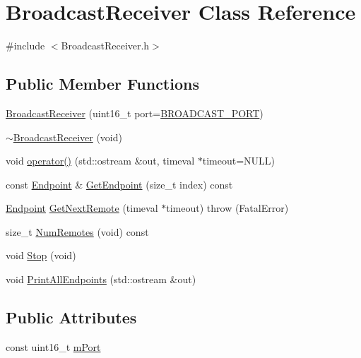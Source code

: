 \hypertarget{class_broadcast_receiver}{\section{Broadcast\-Receiver Class Reference}
\label{class_broadcast_receiver}
}


{\ttfamily \#include $<$Broadcast\-Receiver.\-h$>$}

\subsection*{Public Member Functions}
\begin{DoxyCompactItemize}
\item 
\hyperlink{class_broadcast_receiver_a9c3f8ebdef813f03edec75f88389a6ee}{Broadcast\-Receiver} (uint16\-\_\-t port=\hyperlink{class_broadcast_receiver_a38d37ce60dc1fb1e0dbc08d80b5d3b47}{B\-R\-O\-A\-D\-C\-A\-S\-T\-\_\-\-P\-O\-R\-T})
\item 
\hyperlink{class_broadcast_receiver_a1d262088f10ee4a53d2590bc472864b0}{$\sim$\-Broadcast\-Receiver} (void)
\item 
void \hyperlink{class_broadcast_receiver_ac2fa6c783d73121c800d3c015621964d}{operator()} (std\-::ostream \&out, timeval $\ast$timeout=N\-U\-L\-L)
\item 
const \hyperlink{class_endpoint}{Endpoint} \& \hyperlink{class_broadcast_receiver_a1c487597e1338d5e5fca55f1d89d0eb1}{Get\-Endpoint} (size\-\_\-t index) const 
\item 
\hyperlink{class_endpoint}{Endpoint} \hyperlink{class_broadcast_receiver_a4549672ea1b9b008f93b42329c8bea5f}{Get\-Next\-Remote} (timeval $\ast$timeout)  throw (\-Fatal\-Error)
\item 
size\-\_\-t \hyperlink{class_broadcast_receiver_a6e403e696a76c5bc8c2b9215c3d5704d}{Num\-Remotes} (void) const 
\item 
void \hyperlink{class_broadcast_receiver_ab0f0852ab37655f23bebaca888216502}{Stop} (void)
\item 
void \hyperlink{class_broadcast_receiver_a4b8090a05353668151af7e887acfd32f}{Print\-All\-Endpoints} (std\-::ostream \&out)
\end{DoxyCompactItemize}
\subsection*{Public Attributes}
\begin{DoxyCompactItemize}
\item 
const uint16\-\_\-t \hyperlink{class_broadcast_receiver_a3e1de2825034cb6e2b15641c490d9381}{m\-Port}
\end{DoxyCompactItemize}
